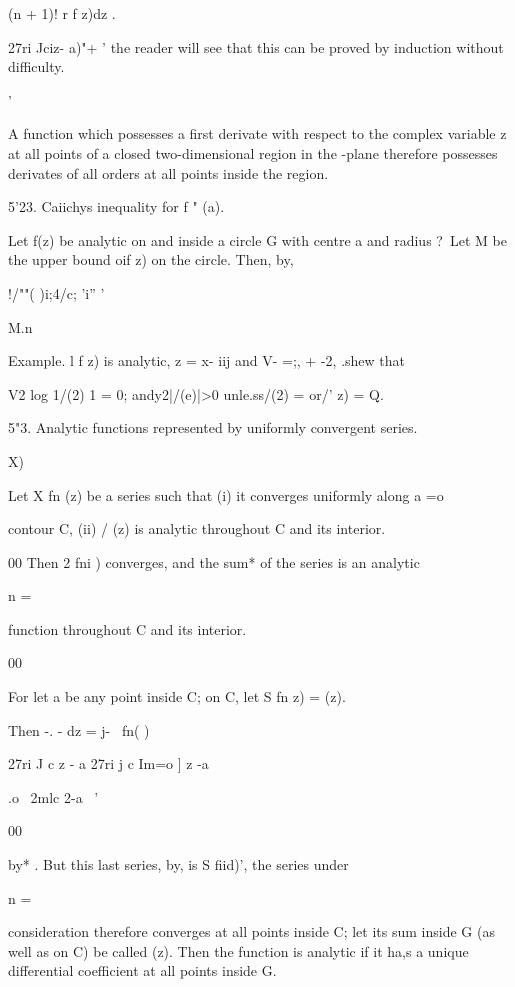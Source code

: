 {{(n + 1)! r f z)dz .

27ri Jciz- a)"+ ' the reader will see that this can be proved by
induction without difficulty.

 '

%
%

A function which possesses a first derivate with respect to the
complex variable z at all points of a closed two-dimensional region in
the -plane therefore possesses derivates of all orders at all points
inside the region.

5'23. Caiichys inequality for f " (a).

Let f(z) be analytic on and inside a circle G with centre a and radius
?\ Let M be the upper bound oif z) on the circle. Then, by,

!/""( )i;4/c; 'i'' '

M.n\

Example. l f z) is analytic, z = x- iij and V- =;, + -2, .shew that

V2 log 1/(2) 1 = 0; andy2|/(e)|>0 unle.ss/(2) = or/' z) = Q.

5"3. Analytic functions represented by uniformly convergent series.

 X)

Let X fn (z) be a series such that (i) it converges uniformly along a
=o

contour C, (ii) / (z) is analytic throughout C and its interior.

00 Then 2 fni ) converges, and the sum* of the series is an analytic

n =

function throughout C and its interior.

00

For let a be any point inside C; on C, let S fn z) = (z).

Then -. - dz = j- \ fn( )\

27ri J c z - a 27ri j c Im=o ] z -a

 .o \ 2mlc 2-a \ '

00

by* . But this last series, by, is S fiid)', the series
under

n =

consideration therefore converges at all points inside C; let its sum
inside G (as well as on C) be called (z). Then the function is
analytic if it ha,s a unique differential coefficient at all points
inside G.

}}
